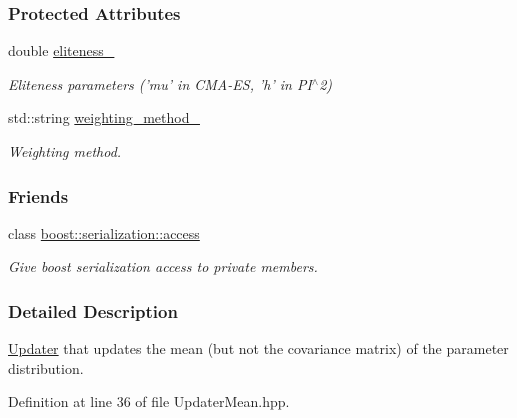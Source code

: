 \subsubsection*{Protected Attributes}
\begin{DoxyCompactItemize}
\item 
\hypertarget{classDmpBbo_1_1UpdaterMean_a9a4488d8ff4010bb33694ad3fafcad3f}{double \hyperlink{classDmpBbo_1_1UpdaterMean_a9a4488d8ff4010bb33694ad3fafcad3f}{eliteness\+\_\+}}\label{classDmpBbo_1_1UpdaterMean_a9a4488d8ff4010bb33694ad3fafcad3f}

\begin{DoxyCompactList}\small\item\em Eliteness parameters ('mu' in C\+M\+A-\/\+E\+S, 'h' in P\+I$^\wedge$2) \end{DoxyCompactList}\item 
\hypertarget{classDmpBbo_1_1UpdaterMean_abc5093717ab1b4a09921a2d6f98b58ba}{std\+::string \hyperlink{classDmpBbo_1_1UpdaterMean_abc5093717ab1b4a09921a2d6f98b58ba}{weighting\+\_\+method\+\_\+}}\label{classDmpBbo_1_1UpdaterMean_abc5093717ab1b4a09921a2d6f98b58ba}

\begin{DoxyCompactList}\small\item\em Weighting method. \end{DoxyCompactList}\end{DoxyCompactItemize}
\subsubsection*{Friends}
\begin{DoxyCompactItemize}
\item 
class \hyperlink{classDmpBbo_1_1UpdaterMean_ac98d07dd8f7b70e16ccb9a01abf56b9c}{boost\+::serialization\+::access}
\begin{DoxyCompactList}\small\item\em Give boost serialization access to private members. \end{DoxyCompactList}\end{DoxyCompactItemize}


\subsubsection{Detailed Description}
\hyperlink{classDmpBbo_1_1Updater}{Updater} that updates the mean (but not the covariance matrix) of the parameter distribution. 

Definition at line 36 of file Updater\+Mean.\+hpp.



